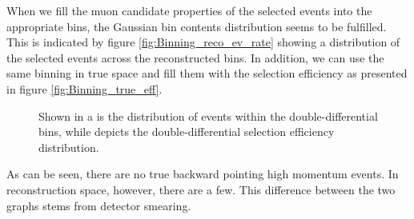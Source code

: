 When we fill the muon candidate properties of the selected events into the appropriate bins, the Gaussian bin contents distribution seems to be fulfilled. This is indicated by figure \ref{fig:Binning_reco_ev_rate} showing a distribution of the selected events across the reconstructed bins. In addition, we can use the same binning in true space and fill them with the selection efficiency as presented in figure \ref{fig:Binning_true_eff}.
\begin{figure}[htbp]
	\begin{center} \centering
        \caption[Filling the Double Differential Histogram]{Shown in a  is the distribution of events within the double-differential bins, while  depicts the double-differential selection efficiency distribution.} 
        \label{fig:FillingDoubleDiff}
	\end{center}
\end{figure}
As can be seen, there are no true backward pointing high momentum events. In reconstruction space, however, there are a few. This difference between the two graphs stems from detector smearing.
 
